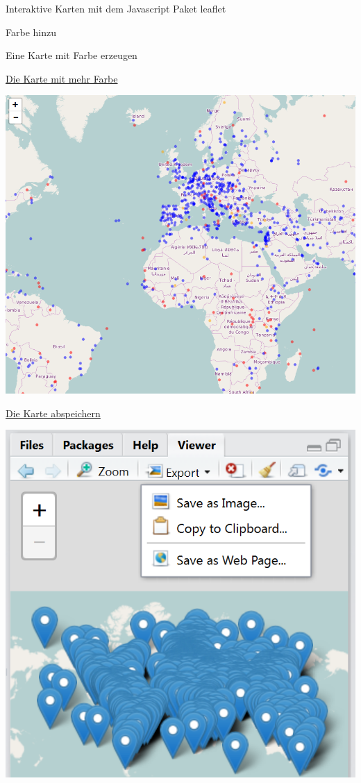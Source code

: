 \documentclass[ignorenonframetext,]{beamer}
\begin{document}
\begin{frame}[fragile]{Interaktive Karten mit dem Javascript Paket
leaflet}
\begin{block}{Farbe hinzu}
\begin{block}{Eine Karte mit Farbe erzeugen}
\end{block}

\end{block}

\begin{block}{\href{https://rpubs.com/Japhilko82/CatWHS}{Die Karte mit
mehr Farbe}}

\includegraphics{./tex2pdf.9796/52e6f8e130c4763dce97b7ea03b9608f4cce6735.png}

\end{block}

\begin{block}{\href{http://www.r-bloggers.com/interactive-mapping-with-leaflet-in-r-2/}{Die
Karte abspeichern}}

\includegraphics{./tex2pdf.9796/6436c1937fa4caa8551cf7037ffe6e75a8a87194.png}


\end{block}
\end{frame}
\end{document}
